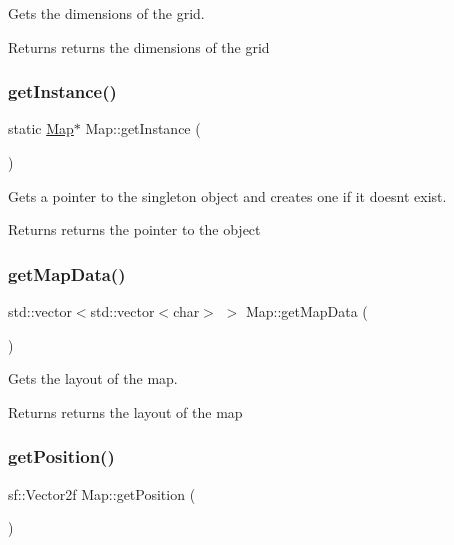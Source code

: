 Gets the dimensions of the grid. 

\begin{DoxyReturn}{Returns}
returns the dimensions of the grid 
\end{DoxyReturn}
\mbox{\label{class_map_ad82f210fd0c31216ec0dd4ae550b8a05}} 
\subsubsection{\texorpdfstring{get\+Instance()}{getInstance()}}
{\footnotesize\ttfamily static \hyperlink{class_map}{Map}$\ast$ Map\+::get\+Instance (\begin{DoxyParamCaption}{ }\end{DoxyParamCaption})\hspace{0.3cm}{\ttfamily [static]}}



Gets a pointer to the singleton object and creates one if it doesnt exist. 

\begin{DoxyReturn}{Returns}
returns the pointer to the object 
\end{DoxyReturn}
\mbox{\label{class_map_a8fdeb5f9534c6605e352367af5c87e7a}} 
\subsubsection{\texorpdfstring{get\+Map\+Data()}{getMapData()}}
{\footnotesize\ttfamily std\+::vector$<$std\+::vector$<$char$>$ $>$ Map\+::get\+Map\+Data (\begin{DoxyParamCaption}{ }\end{DoxyParamCaption})}



Gets the layout of the map. 

\begin{DoxyReturn}{Returns}
returns the layout of the map 
\end{DoxyReturn}
\mbox{\label{class_map_aabb556f4fc11e03ecebcaf270e5137d3}} 
\subsubsection{\texorpdfstring{get\+Position()}{getPosition()}}
{\footnotesize\ttfamily sf\+::\+Vector2f Map\+::get\+Position (\begin{DoxyParamCaption}{ }\end{DoxyParamCaption})}



